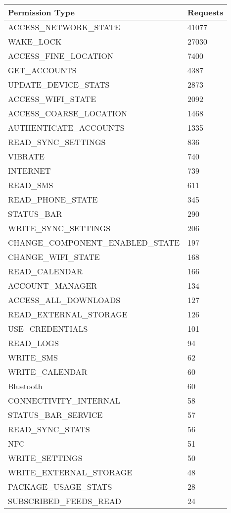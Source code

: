 \documentclass[letterpaper,twocolumn,10pt]{article}
\begin{document}
{{\center
\small
\begin{tabular}{|l|l|}
\hline
\textbf{Permission Type} & \textbf{Requests} \\ \hline
ACCESS\_NETWORK\_STATE & 41077 \\ \hline
WAKE\_LOCK & 27030 \\ \hline
ACCESS\_FINE\_LOCATION & 7400 \\ \hline
GET\_ACCOUNTS & 4387 \\ \hline
UPDATE\_DEVICE\_STATS & 2873 \\ \hline
ACCESS\_WIFI\_STATE & 2092 \\ \hline
ACCESS\_COARSE\_LOCATION & 1468 \\ \hline
AUTHENTICATE\_ACCOUNTS & 1335 \\ \hline
READ\_SYNC\_SETTINGS & 836 \\ \hline
VIBRATE & 740 \\ \hline
INTERNET & 739 \\ \hline
READ\_SMS & 611 \\ \hline
READ\_PHONE\_STATE & 345 \\ \hline
STATUS\_BAR & 290 \\ \hline
WRITE\_SYNC\_SETTINGS & 206 \\ \hline
CHANGE\_COMPONENT\_ENABLED\_STATE & 197 \\ \hline
CHANGE\_WIFI\_STATE & 168 \\ \hline
READ\_CALENDAR & 166 \\ \hline
ACCOUNT\_MANAGER & 134 \\ \hline
ACCESS\_ALL\_DOWNLOADS & 127 \\ \hline
READ\_EXTERNAL\_STORAGE & 126 \\ \hline
USE\_CREDENTIALS & 101 \\ \hline
READ\_LOGS & 94 \\ \hline
WRITE\_SMS & 62 \\ \hline
WRITE\_CALENDAR & 60 \\ \hline
Bluetooth & 60 \\ \hline
CONNECTIVITY\_INTERNAL & 58 \\ \hline
STATUS\_BAR\_SERVICE & 57 \\ \hline
READ\_SYNC\_STATS & 56 \\ \hline
NFC & 51 \\ \hline
WRITE\_SETTINGS & 50 \\ \hline
WRITE\_EXTERNAL\_STORAGE & 48 \\ \hline
PACKAGE\_USAGE\_STATS & 28 \\ \hline
SUBSCRIBED\_FEEDS\_READ & 24 \\ \hline
\end{tabular}
}

}
\end{document}
